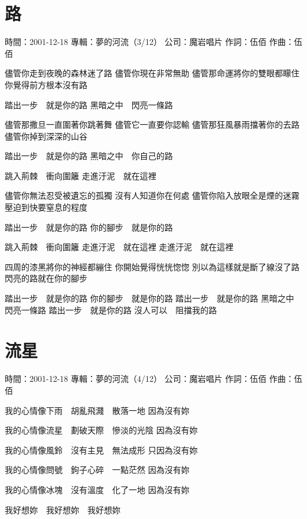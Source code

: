 \documentclass[UTF8,a4paper,oneside,twocolumn,12pt]{ctexbook}
\newcommand{\infopair}[2]{\textbullet #1：#2}
\newcommand{\zc}[1][伍佰]{\infopair{作詞}{#1}}
\newcommand{\zq}[1][伍佰]{\infopair{作曲}{#1}}
\newcommand{\zj}[1]{\infopair{專輯}{#1}}
\newcommand{\sj}[1]{\infopair{時間}{#1}}
\newcommand{\gs}[1]{\infopair{公司}{#1}}
\newenvironment{info}{\begin{flushleft}\kaishu
	}
	{\end{flushleft}\normalsize\yahei\par}
\newenvironment{lyric}{
	}
{}
\begin{document}
\section{路}
\begin{info}
	\sj{2001-12-18}
	\zj{夢的河流（3/12）}
	\gs{魔岩唱片}
	\zc
	\zq
\end{info}
\begin{lyric}
	儘管你走到夜晚的森林迷了路
	儘管你現在非常無助
	儘管那命運將你的雙眼都矇住
	你覺得前方根本沒有路

	踏出一步　就是你的路
	黑暗之中　閃亮一條路

	儘管那撒旦一直圍著你跳著舞
	儘管它一直要你認輸
	儘管那狂風暴雨擋著你的去路
	儘管你掉到深深的山谷

	踏出一步　就是你的路
	黑暗之中　你自己的路

	跳入荊棘　衝向圍籬
	走進汙泥　就在這裡

	儘管你無法忍受被遺忘的孤獨
	沒有人知道你在何處
	儘管你陷入放眼全是煙的迷霧
	壓迫到快要窒息的程度

	踏出一步　就是你的路
	你的腳步　就是你的路

	跳入荊棘　衝向圍籬
	走進汙泥　就在這裡
	走進汙泥　就在這裡

	四周的漆黑將你的神經都繃住
	你開始覺得恍恍惚惚
	別以為這樣就是斷了線沒了路
	閃亮的路就在你的腳步

	踏出一步　就是你的路
	你的腳步　就是你的路
	踏出一步　就是你的路
	黑暗之中　閃亮一條路
	踏出一步　就是你的路
	沒人可以　阻擋我的路
\end{lyric}

\section{流星}
\begin{info}
	\sj{2001-12-18}
	\zj{夢的河流（4/12）}
	\gs{魔岩唱片}
	\zc
	\zq
\end{info}
\begin{lyric}
	我的心情像下雨　胡亂飛濺　散落一地
	因為沒有妳

	我的心情像流星　劃破天際　慘淡的光陰
	因為沒有妳

	我的心情像風鈴　沒有主見　無法成形
	只因為沒有妳

	我的心情像問號　鉤子心碎　一點茫然
	因為沒有妳

	我的心情像冰塊　沒有溫度　化了一地
	因為沒有妳

	我好想妳　我好想妳　我好想妳
\end{lyric}
\end{document}
